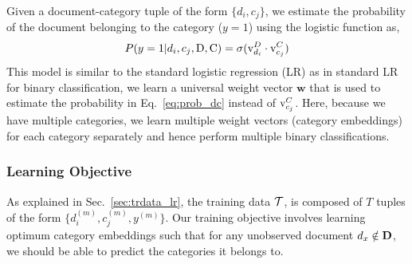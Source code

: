 Given a document-category tuple of the form $\{d_{i}, c_{j}\}$, we estimate the probability of the document belonging to the category ($y = 1$) using the logistic function as,
\begin{equation}
\label{eq:prob_dc}
P(y=1|d_{i}, c_{j}, \mathrm{D}, \mathrm{C}) = \sigma(\mathrm{v}^{D}_{d_{i}}\cdot \mathrm{v}^{C}_{c_{j}})
\end{equation}
This model is similar to the standard logistic regression (LR) as in standard LR for binary classification, we learn a universal weight vector $\mathbf{w}$ that is used to estimate the probability in Eq.~\ref{eq:prob_dc} instead of $\mathrm{v}^{C}_{c_{j}}$. Here, because we have multiple categories, we learn multiple weight vectors (category embeddings) for each category separately and hence perform multiple binary classifications.

\subsubsection{Learning Objective}
\label{sec:tro_lr}
As explained in Sec.~\ref{sec:trdata_lr}, the training data $\mathcal{T}$, is composed of $T$ tuples of the form $\{ d^{(m)}_{i}, c^{(m)}_{j}, y^{(m)}\}$. Our training objective involves learning optimum category embeddings such that for any unobserved document $d_{x} \notin \mathbf{D}$, we should be able to predict the categories it belongs to.

